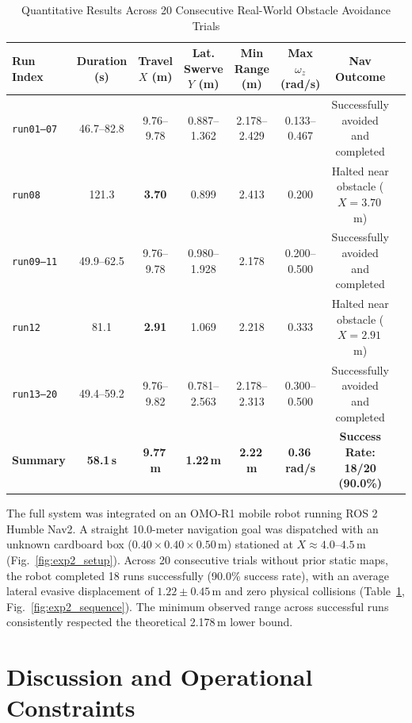 \documentclass[12pt]{iopart}
\begin{document}
\begin{table}[!t]
  \centering
  \caption{Quantitative Results Across 20 Consecutive Real-World Obstacle Avoidance Trials}
  \label{tab:exp2_results}
  \begin{tabularx}{\textwidth}{lccccccX}
    \toprule
    Run Index & Duration (s) & Travel $X$ (m) & Lat. Swerve $Y$ (m) & Min Range (m) & Max $\omega_z$ (rad/s) & Nav Outcome \\
    \midrule
    \texttt{run01--07} & 46.7--82.8 & 9.76--9.78 & 0.887--1.362 & 2.178--2.429 & 0.133--0.467 & Successfully avoided and completed \\
    \texttt{run08} & 121.3 & \textbf{3.70} & 0.899 & 2.413 & 0.200 & Halted near obstacle ($X=3.70$\,m) \\
    \texttt{run09--11} & 49.9--62.5 & 9.76--9.78 & 0.980--1.928 & 2.178 & 0.200--0.500 & Successfully avoided and completed \\
    \texttt{run12} & 81.1 & \textbf{2.91} & 1.069 & 2.218 & 0.333 & Halted near obstacle ($X=2.91$\,m) \\
    \texttt{run13--20} & 49.4--59.2 & 9.76--9.82 & 0.781--2.563 & 2.178--2.313 & 0.300--0.500 & Successfully avoided and completed \\
    \midrule
    \textbf{Summary} & \textbf{58.1\,s} & \textbf{9.77\,m} & \textbf{1.22\,m} & \textbf{2.22\,m} & \textbf{0.36\,rad/s} & \textbf{Success Rate: 18/20 (90.0\%)} \\
    \bottomrule
  \end{tabularx}
\end{table}

The full system was integrated on an OMO-R1 mobile robot running ROS 2 Humble Nav2. A straight 10.0-meter navigation goal was dispatched with an unknown cardboard box ($0.40 \times 0.40 \times 0.50$\,m) stationed at $X \approx 4.0\text{--}4.5$\,m (Fig.~\ref{fig:exp2_setup}). Across 20 consecutive trials without prior static maps, the robot completed 18 runs successfully (90.0\% success rate), with an average lateral evasive displacement of $1.22 \pm 0.45$\,m and zero physical collisions (Table~\ref{tab:exp2_results}, Fig.~\ref{fig:exp2_sequence}). The minimum observed range across successful runs consistently respected the theoretical 2.178\,m lower bound.

\section{Discussion and Operational Constraints}
\label{sec:discussion}
\end{document}
